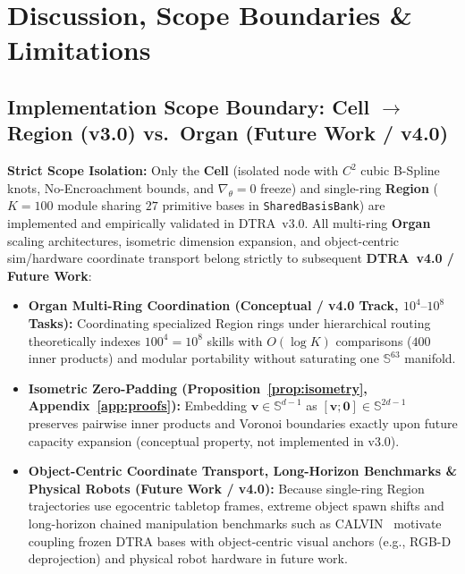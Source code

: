 \documentclass[10pt]{article}
\begin{document}
\section{Discussion, Scope Boundaries \& Limitations}
\label{sec:discussion}

\subsection{Implementation Scope Boundary: Cell \texorpdfstring{$\to$}{->} Region (v3.0) vs.\ Organ (Future Work / v4.0)}
\textbf{Strict Scope Isolation:} Only the \textbf{Cell} (isolated node with $C^2$ cubic B-Spline knots, No-Encroachment bounds, and $\nabla_\theta=0$ freeze) and single-ring \textbf{Region} ($K=100$ module sharing $27$ primitive bases in \texttt{SharedBasisBank}) are implemented and empirically validated in DTRA~v3.0. All multi-ring \textbf{Organ} scaling architectures, isometric dimension expansion, and object-centric sim/hardware coordinate transport belong strictly to subsequent \textbf{DTRA~v4.0 / Future Work}:
\begin{itemize}[leftmargin=*,itemsep=1.5pt,topsep=2pt]
  \item \textbf{Organ Multi-Ring Coordination (Conceptual / v4.0 Track, $10^4\text{--}10^8$ Tasks):} Coordinating specialized Region rings under hierarchical routing theoretically indexes $100^4 = 10^8$ skills with $O(\log K)$ comparisons ($400$ inner products) and modular portability without saturating one $\mathbb{S}^{63}$ manifold.
  \item \textbf{Isometric Zero-Padding (Proposition~\ref{prop:isometry}, Appendix~\ref{app:proofs}):} Embedding $\mathbf{v} \in \mathbb{S}^{d-1}$ as $[\mathbf{v}; \mathbf{0}] \in \mathbb{S}^{2d-1}$ preserves pairwise inner products and Voronoi boundaries exactly upon future capacity expansion (conceptual property, not implemented in v3.0).
  \item \textbf{Object-Centric Coordinate Transport, Long-Horizon Benchmarks \& Physical Robots (Future Work / v4.0):} Because single-ring Region trajectories use egocentric tabletop frames, extreme object spawn shifts and long-horizon chained manipulation benchmarks such as CALVIN~\cite{mees2022calvin} motivate coupling frozen DTRA bases with object-centric visual anchors (e.g., RGB-D deprojection) and physical robot hardware in future work.
\end{itemize}
\end{document}
